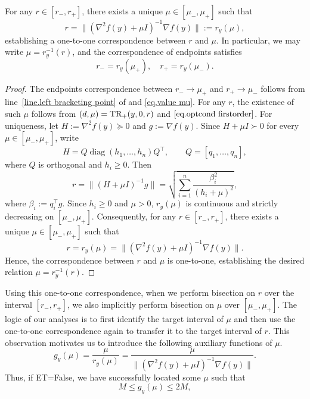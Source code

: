 \documentclass{article}
\begin{document}
\begin{lemma}
    \label{lem.one-to-one correspondence}
    For any $r \in [r_-, r_+]$, there exists a unique $\mu \in [\mu_-, \mu_+]$ such that
    \[
        r = \|(\nabla^2 f(y) + \mu I)^{-1} \nabla f(y)\| := r_y(\mu),
    \]
    establishing a one-to-one correspondence between $r$ and $\mu$.
    In particular, we may write $\mu = r_y^{-1}(r)$,
    and the correspondence of endpoints satisfies
    \[
        r_- = r_y(\mu_+),
        \quad
        r_+ = r_y(\mu_-).
    \]
\end{lemma}
\begin{proof}
    The endpoints correspondence between $r_- \to \mu_+$ and $r_+ \to \mu_-$ follows from line~\ref{line.left bracketing point} of  and \eqref{eq.value mu}.
    For any $r$, the existence of such $\mu$ follows from $(d,\mu)=\textrm{TR}_+(y,0,r)$ and $\eqref{eq.optcond firstorder}$. For uniqueness, let $H:=\nabla^2 f(y)\succeq0$ and $g:=\nabla f(y)$. Since $H+\mu I\succ0$ for every $\mu\in[\mu_-,\mu_+]$, write
    \[
        H=Q\operatorname{diag}(h_1,\ldots,h_n)Q^\top,
        \qquad Q=[q_1,\ldots,q_n],
    \]
    where $Q$ is orthogonal and $h_i\geq0$.
    Then
    \[
        r = \bigl\|(H + \mu I)^{-1}g\bigr\|
        = \sqrt{\sum_{i=1}^n \frac{\beta_i^2}{(h_i + \mu)^2}},
    \]
    where $\beta_i:=q_i^\top g$. Since $h_i\geq0$ and $\mu>0$, $r_y(\mu)$ is continuous and strictly decreasing on $[\mu_-,\mu_+]$.
    Consequently, for any $r \in [r_-, r_+]$, there exists a unique $\mu \in [\mu_-, \mu_+]$ such that
    \[
        r = r_y(\mu) = \bigl\|(\nabla^2 f(y) + \mu I)^{-1}\nabla f(y)\bigr\|.
    \]
    Hence, the correspondence between $r$ and $\mu$ is one-to-one, establishing the desired relation $\mu = r_y^{-1}(r)$.
\end{proof}
Using this one-to-one correspondence, when we perform bisection on $r$ over the interval $[r_-,r_+]$, we also implicitly perform bisection on $\mu$ over $[\mu_-,\mu_+]$. The logic of our analyses is to first identify the target interval of $\mu$ and then use the one-to-one correspondence again to transfer it to the target interval of $r$. This observation motivates us to introduce the following auxiliary functions of $\mu$.
\begin{equation}
    \label{eq.auxiliary function for bisection}
    g_y(\mu) =\frac{\mu}{r_y(\mu)}=\frac{\mu}{\| (\nabla^2 f(y)+\mu I)^{-1}\nabla f(y)\|}.
\end{equation}
Thus, if ET=False, we have successfully located some $\mu$ such that
\begin{equation*}
    M \leq g_y(\mu) \leq 2M,
\end{equation*}
\end{document}
